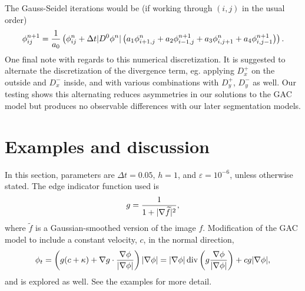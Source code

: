 The Gauss-Seidel iterations would be (if working through $(i,j)$ in the usual order)
\begin{align*}
\phi^{n+1}_{ij} 
= \frac{1}{a_0} 
\left( \phi^n_{ij} + \Delta t \lvert D^0 \phi^n\rvert
\left( a_1 \phi^n_{i+1,j} + a_2 \phi^{n+1}_{i-1,j} + a_3 \phi^{n}_{i,j+1} + a_4 \phi^{n+1}_{i,j-1}
\right)
\right).
\end{align*}
One final note with regards to this numerical discretization. It is suggested to alternate the discretization of the divergence term, eg. applying $D^+_x$ on the outside and $D^-_x$ inside, and with various combinations with $D^+_y$, $D^-_y$ as well. Our testing shows this alternating reduces asymmetries in our solutions to the GAC model but produces no observable differences with our later segmentation models.


\section{Examples and discussion} 
In this section, parameters are $\Delta t = 0.05$, $h = 1$, and $\varepsilon = 10^{-6}$, unless otherwise stated.
The edge indicator function used is 
\begin{align*}
g = \frac{1}{1 + \lvert\nabla \widetilde f\rvert^2 },
\end{align*}
where $\widetilde f$ is a Gaussian-smoothed version of the image $f$. Modification of the GAC model to include a constant velocity, $c$, in the normal direction, 
\begin{align}
\phi_t 
= \left( g ( c + \kappa) + \nabla g \cdot \frac{\nabla \phi}{\lvert\nabla \phi\rvert} \right) \lvert\nabla \phi\rvert
= 
\lvert\nabla \phi\rvert \operatorname{div}\left( g \frac{\nabla \phi}{\lvert\nabla \phi\rvert} \right) 
+ cg \lvert\nabla \phi\rvert,
\label{eq:gac+c}
\end{align}
and is explored as well. See the examples for more detail.


